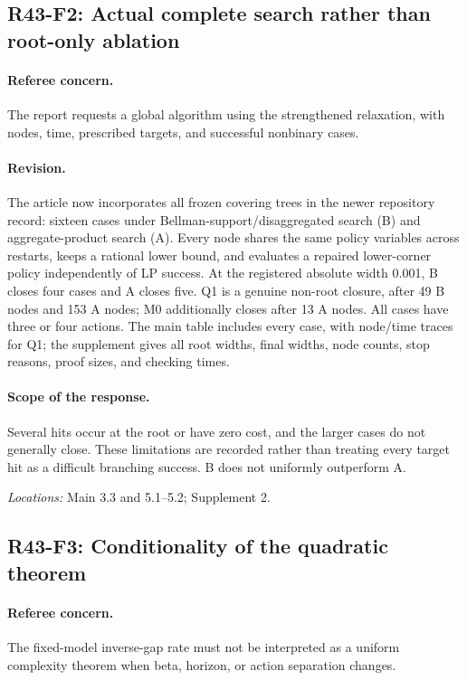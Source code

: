 \subsection{R43-F2: Actual complete search rather than root-only ablation}
\paragraph*{Referee concern.} The report requests a global algorithm using the strengthened relaxation, with nodes, time, prescribed targets, and successful nonbinary cases.

\paragraph*{Revision.} The article now incorporates all frozen covering trees in the newer repository record: sixteen cases under Bellman-support/disaggregated search (B) and aggregate-product search (A). Every node shares the same policy variables across restarts, keeps a rational lower bound, and evaluates a repaired lower-corner policy independently of LP success. At the registered absolute width 0.001, B closes four cases and A closes five. Q1 is a genuine non-root closure, after 49 B nodes and 153 A nodes; M0 additionally closes after 13 A nodes. All cases have three or four actions. The main table includes every case, with node/time traces for Q1; the supplement gives all root widths, final widths, node counts, stop reasons, proof sizes, and checking times.

\paragraph*{Scope of the response.} Several hits occur at the root or have zero cost, and the larger cases do not generally close. These limitations are recorded rather than treating every target hit as a difficult branching success. B does not uniformly outperform A.

\noindent\textit{Locations:} Main 3.3 and 5.1--5.2; Supplement 2.

\subsection{R43-F3: Conditionality of the quadratic theorem}
\paragraph*{Referee concern.} The fixed-model inverse-gap rate must not be interpreted as a uniform complexity theorem when beta, horizon, or action separation changes.

